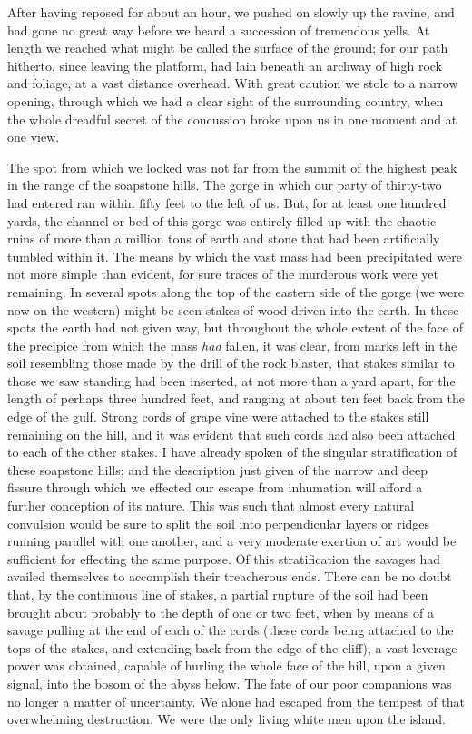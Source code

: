 After having reposed for about an hour, we pushed on slowly up the ravine,
and had gone no great way before we heard a succession of tremendous yells. At
length we reached what might be called the surface of the ground; for our path
hitherto, since leaving the platform, had lain beneath an archway of high rock
and foliage, at a vast distance overhead. With great caution we stole to a
narrow opening, through which we had a clear sight of the surrounding country,
when the whole dreadful secret of the concussion broke upon us in one moment and
at one view. 

The spot from which we looked was not far from the summit of the highest peak
in the range of the soapstone hills. The gorge in which our party of thirty-two
had entered ran within fifty feet to the left of us. But, for at least one
hundred yards, the channel or bed of this gorge was entirely filled up with the
chaotic ruins of more than a million tons of earth and stone that had been
artificially tumbled within it. The means by which the vast mass had been
precipitated were not more simple than evident, for sure traces of the murderous
work were yet remaining. In several spots along the top of the eastern side of
the gorge (we were now on the western) might be seen stakes of wood driven into
the earth. In these spots the earth had not given way, but throughout the whole
extent of the face of the precipice from which the mass \emph{had} fallen, it
was clear, from marks left in the soil resembling those made by the drill of the
rock blaster, that stakes similar to those we saw standing had been inserted, at
not more than a yard apart, for the length of perhaps three hundred feet, and
ranging at about ten feet back from the edge of the gulf. Strong cords of grape
vine were attached to the stakes still remaining on the hill, and it was evident
that such cords had also been attached to each of the other stakes. I have
already spoken of the singular stratification of these soapstone hills; and the
description just given of the narrow and deep fissure through which we effected
our escape from inhumation will afford a further conception of its nature. This
was such that almost every natural convulsion would be sure to split the soil
into perpendicular layers or ridges running parallel with one another, and a
very moderate exertion of art would be sufficient for effecting the same
purpose. Of this stratification the savages had availed themselves to accomplish
their treacherous ends. There can be no doubt that, by the continuous line of
stakes, a partial rupture of the soil had been brought about probably to the
depth of one or two feet, when by means of a savage pulling at the end of each
of the cords (these cords being attached to the tops of the stakes, and
extending back from the edge of the cliff), a vast leverage power was obtained,
capable of hurling the whole face of the hill, upon a given signal, into the
bosom of the abyss below. The fate of our poor companions was no longer a matter
of uncertainty. We alone had escaped from the tempest of that overwhelming
destruction. We were the only living white men upon the island. 

